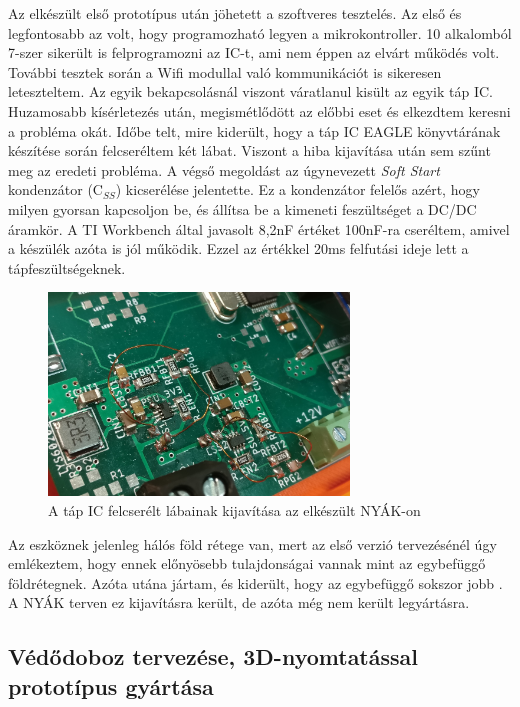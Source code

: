 \documentclass[../main.tex]{subfiles}
\begin{document}
        Az elkészült első prototípus után jöhetett a szoftveres tesztelés. Az első és legfontosabb az volt, hogy programozható legyen a mikrokontroller. 10 alkalomból 7-szer sikerült is felprogramozni az IC-t, ami nem éppen az elvárt működés volt. További tesztek során a Wifi modullal való kommunikációt is sikeresen leteszteltem. Az egyik bekapcsolásnál viszont váratlanul kisült az egyik táp IC. Huzamosabb kísérletezés után, megismétlődött az előbbi eset és elkezdtem keresni a probléma okát. Időbe telt, mire kiderült, hogy a táp IC EAGLE könyvtárának készítése során felcseréltem két lábat. Viszont a hiba kijavítása után sem szűnt meg az eredeti probléma. A végső megoldást az úgynevezett \textit{Soft Start} kondenzátor (C$_{SS}$) kicserélése jelentette. Ez a kondenzátor felelős azért, hogy milyen gyorsan kapcsoljon be, és állítsa be a kimeneti feszültséget a DC/DC áramkör\cite{ds_tps56}. A TI Workbench által javasolt 8,2nF értéket 100nF-ra cseréltem, amivel a készülék azóta is jól működik. Ezzel az értékkel 20ms felfutási ideje lett a tápfeszültségeknek.
        
        \begin{figure}[h!]
            \centering
                \includegraphics[width=8cm]{resources/pcb_res/pcb_psu_lib_fail}
            \caption{A táp IC felcserélt lábainak kijavítása az elkészült NYÁK-on}
            \label{fig:pcb_psu_fail}
        \end{figure}
        
        Az eszköznek jelenleg hálós föld rétege van, mert az első verzió tervezésénél úgy emlékeztem, hogy ennek előnyösebb tulajdonságai vannak mint az egybefüggő földrétegnek. Azóta utána jártam, és kiderült, hogy az egybefüggő sokszor jobb \cite{ground_planes}. A NYÁK terven ez kijavításra került, de azóta még nem került legyártásra.
        
    \subsection{Védődoboz tervezése, 3D-nyomtatással prototípus gyártása}
    
\end{document}
